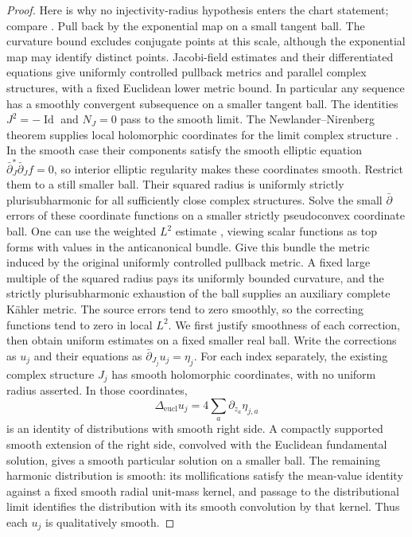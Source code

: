 \documentclass[11pt]{article}
\theoremstyle{definition}
\theoremstyle{remark}
\newcommand{\dbar}{\bar\partial}
\DeclareMathOperator{\Id}{Id}
\numberwithin{equation}{section}
\begin{document}
\begin{proof}
Here is why no injectivity-radius hypothesis enters the chart
statement; compare \cite[Lemma~2.2]{ChauTamSimply}.
Pull back by the exponential map on a small tangent ball.  The
curvature bound excludes conjugate points at this scale, although
the exponential map may identify distinct points.  Jacobi-field
estimates and their differentiated equations give uniformly
controlled pullback metrics and parallel complex structures, with
a fixed Euclidean lower metric bound.  In particular any sequence
has a smoothly convergent subsequence on a smaller tangent ball.
The identities $J^2=-\Id$ and $N_J=0$ pass to the smooth limit.
The Newlander--Nirenberg theorem supplies local holomorphic coordinates
for the limit complex structure \cite{NewlanderNirenberg}
\cite[Theorem~1.1]{HillTaylor}.  In the smooth case their components
satisfy the smooth elliptic equation $\bar\partial_J^*\bar\partial_J f=0$,
so interior elliptic regularity makes these coordinates smooth.
Restrict them to a still smaller ball.  Their squared radius is uniformly strictly
plurisubharmonic for all sufficiently close complex structures.
Solve the small $\dbar$ errors of these coordinate functions on
a smaller strictly pseudoconvex coordinate ball.  One can use the
weighted $L^2$ estimate \cite{Hormander,Demailly}, viewing scalar
functions as top forms with values in the anticanonical bundle.
Give this bundle the metric induced by the original uniformly
controlled pullback metric.  A fixed large multiple of the squared
radius pays its uniformly
bounded curvature, and the strictly plurisubharmonic exhaustion
of the ball supplies an auxiliary complete K\"ahler metric.
The source errors tend to zero smoothly, so the correcting
functions tend to zero in local $L^2$.  We first justify smoothness of
each correction, then obtain uniform estimates on a fixed smaller
real ball.  Write the corrections as $u_j$
and their equations as $\dbar_{J_j}u_j=\eta_j$.
For each index separately, the existing complex structure $J_j$
has smooth holomorphic coordinates, with no uniform radius asserted.
In those coordinates,
\[
 \Delta_{\mathrm{eucl}}u_j
   =4\sum_a\partial_{z_a}\eta_{j,a}
\]
is an identity of distributions with smooth right side.  A compactly
supported smooth extension of the right side, convolved with the
Euclidean fundamental solution, gives a smooth particular solution
on a smaller ball.
The remaining harmonic distribution is smooth: its mollifications
satisfy the mean-value identity against a fixed smooth radial
unit-mass kernel, and passage to the distributional limit identifies
the distribution with its smooth convolution by that kernel.
Thus each $u_j$ is qualitatively smooth.


\end{proof}
\end{document}
